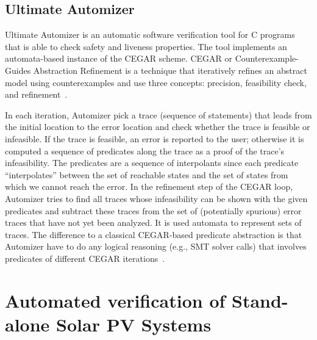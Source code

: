 \documentclass[runningheads]{llncs}
\begin{document}
\subsection{Ultimate Automizer}
Ultimate Automizer is an automatic software verification tool for C programs that is able to check safety and liveness properties. The tool implements an automata-based instance of the CEGAR scheme. CEGAR or Counterexample-Guides Abstraction Refinement is a technique that iteratively refines an abstract model using counterexamples and use three concepts: precision, feasibility check, and refinement~\cite{CEGAR}.

In each iteration, Automizer pick a trace (sequence of statements) that leads from the initial location to the error location and check whether the trace is feasible or infeasible. If the trace is feasible, an error is reported to the user; otherwise it is computed a sequence of predicates along the trace as a proof of the trace’s infeasibility. The predicates are a sequence of interpolants since each predicate “interpolates” between the set of reachable states and the set of states from which we cannot reach the error. In the refinement step of the CEGAR loop, Automizer tries to find all traces whose infeasibility can be shown with the given predicates and subtract these traces from the set of (potentially spurious) error traces that have not yet been analyzed. It is used automata to represent sets of traces. The difference to a classical CEGAR-based predicate abstraction is that Automizer have to do any logical reasoning (e.g., SMT solver calls) that involves predicates of different CEGAR iterations~\cite{Automizer2018}. 
%
\section{Automated verification of Stand-alone Solar PV Systems }
\label{sec:Methodology}
\end{document}
